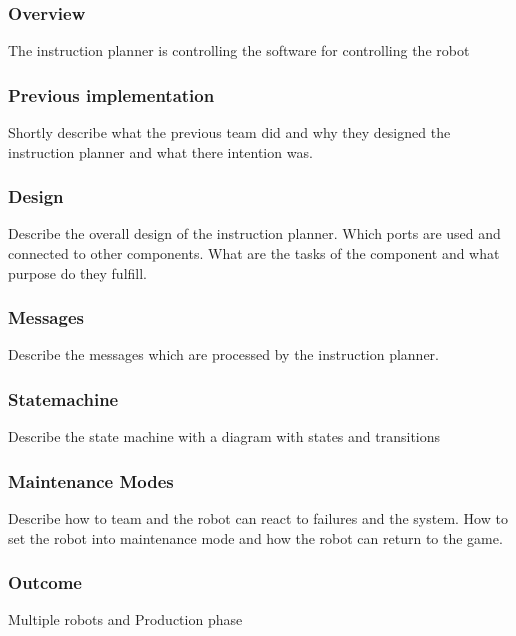 \subsubsection{Overview}

The instruction planner is controlling the software for 
controlling the robot \\

\subsubsection{Previous implementation}
Shortly describe what the previous team did and why they designed the instruction planner and what 
there intention was. 

\subsubsection{Design}

Describe the overall design of the instruction planner. Which ports are used and connected to other components. What are the tasks of the component and what purpose do they fulfill. 


\subsubsection{Messages}

Describe the messages which are processed by the instruction planner. 

\subsubsection{Statemachine}

Describe the state machine with a diagram with states
and transitions

\subsubsection{Maintenance Modes}

Describe how to team and the robot can react to failures and the system. How to set the robot into maintenance mode and how the robot can return to the game. 


\subsubsection{Outcome}

Multiple robots and Production phase







